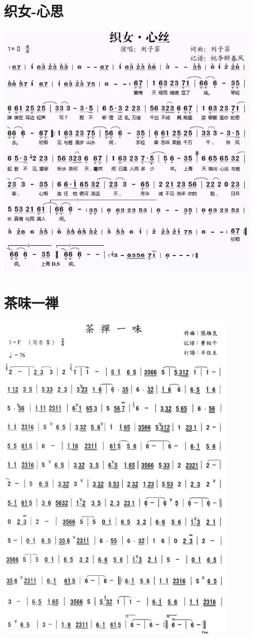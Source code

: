 \documentclass[cn,pad,twocol]{elegantbook}
\begin{document}
\section{织女-心思}\includegraphics[width=\textwidth]{dongxiao/20200819/织女-心思.jpeg}
\section{茶味一禅}\includegraphics[width=0.9\textwidth]{dongxiao/20200819/茶禅一味.jpeg}
\end{document}
